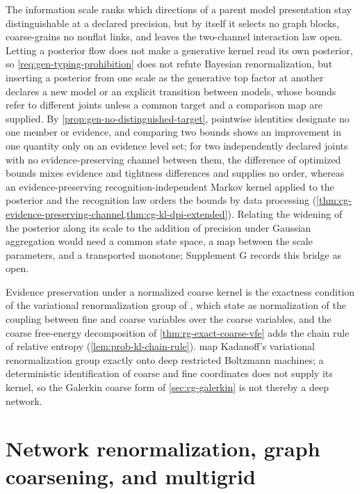 The information scale ranks which directions of a parent model presentation stay
distinguishable at a declared precision, but by itself it selects no graph
blocks, coarse-grains no nonflat links, and leaves the two-channel interaction
law open. Letting
a posterior flow does not make a generative kernel read its own posterior, so
\cref{req:gen-typing-prohibition} does not refute Bayesian renormalization, but
inserting a posterior from one scale as the generative top factor at another
declares a new model or an explicit transition between models, whose bounds
refer to different joints unless a common target and a comparison map are
supplied. By \cref{prop:gen-no-distinguished-target}, pointwise identities
designate no one member or evidence, and comparing two bounds shows an
improvement in one quantity only on an evidence level set; for two independently
declared joints with no evidence-preserving channel between them, the
difference of optimized bounds mixes evidence and tightness differences and
supplies no order, whereas an evidence-preserving recognition-independent Markov
kernel applied to the posterior and the recognition law orders the bounds by
data processing (\cref{thm:cg-evidence-preserving-channel,thm:cg-kl-dpi-extended}).
Relating the widening of the posterior along its scale to the addition of
precision under Gaussian aggregation would need a common state space, a map
between the scale parameters, and a transported monotone; Supplement G records
this bridge as open.

Evidence preservation under a normalized coarse kernel is the exactness
condition of the variational renormalization group of
\citet{KadanoffHoughtonYalabik1976}, which \citet[Eqs.~(8)--(9)]{MehtaSchwab2014}
state as normalization of the coupling between fine and coarse variables over
the coarse variables, and the coarse free-energy decomposition of
\cref{thm:rg-exact-coarse-vfe} adds the chain rule of relative entropy
(\cref{lem:prob-kl-chain-rule}). \citet{MehtaSchwab2014} map Kadanoff's variational renormalization group
exactly onto deep restricted Boltzmann machines; a deterministic
identification of coarse and fine coordinates does not supply its kernel, so the
Galerkin coarse form of \cref{sec:cg-galerkin} is not thereby a deep network.

\section{Network renormalization, graph coarsening, and multigrid}
\label{sec:grg-literature-boundary}
\label{sec:full-graph-vfe-literature}

